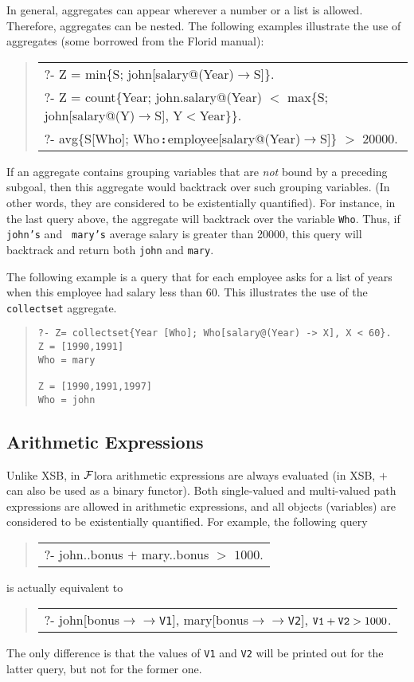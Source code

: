\documentclass[11pt]{article}
\newenvironment{qrules}{\begin{quote}\sf\begin{tabular}[t]{l}}%
{\end{tabular}\end{quote}}
\newcommand{\isa}{\,{\bf{:}}\,}
\newcommand{\fd}{\ensuremath{{\rightarrow}}}                   %
\newcommand{\mvd}{\ensuremath{{\rightarrow\!\!\!\!\rightarrow}}}  %
\newcommand{\FLORA}{{\mbox{${\cal F}${\sc lora}}}\xspace}
\newcommand{\FLORID}{{\mbox{\sc Florid}}\xspace}
\begin{document}
In general, aggregates can appear wherever a number or a list is
allowed. Therefore, aggregates can be nested. The following examples
illustrate the use of aggregates (some borrowed from the \FLORID manual):
\begin{qrules}
  ?- Z = min\{S; john[salary@(Year){\fd}S]\}. \\
  ?- Z = count\{Year; john.salary@(Year) $<$ max\{S; john[salary@(Y){\fd}S],
  Y$<$Year\}\}. \\
  ?- avg\{S[Who]; Who{\isa}employee[salary@(Year){\fd}S]\} $>$ 20000. 
\end{qrules}
If an aggregate contains grouping variables that are \emph{not} bound by a
preceding subgoal, then this aggregate would backtrack over such grouping
variables. (In other words, they are considered to be existentially
quantified). For instance, in the last query above, the aggregate will
backtrack over the variable {\tt Who}. Thus, if {\tt john's} and {\tt
  mary's} average salary is greater than 20000, this query will backtrack
and return both {\tt john} and {\tt mary}.

The following example is a query that for each employee asks for a list of
years when this employee had salary less than 60. This illustrates the use
of the {\tt collectset} aggregate.
\begin{quote}
\begin{verbatim}
?- Z= collectset{Year [Who]; Who[salary@(Year) -> X], X < 60}.
Z = [1990,1991]
Who = mary

Z = [1990,1991,1997]
Who = john
\end{verbatim}
\end{quote}

\subsection{Arithmetic Expressions}

Unlike XSB, in \FLORA arithmetic expressions are always evaluated (in XSB,
$+$ can also be used as a binary functor). Both single-valued and
multi-valued path expressions are allowed in arithmetic expressions, and
all objects (variables) are considered to be existentially quantified. For
example, the following query
\begin{qrules}
?- john..bonus $+$ mary..bonus $>$ $1000$.
\end{qrules}
is actually equivalent to
\begin{qrules}
?- john[bonus{\mvd}{\tt V1}], mary[bonus{\mvd}{\tt V2}], ${\tt V1}+{\tt V2} > 1000$.
\end{qrules}
The only difference is that the values of {\tt V1} and {\tt V2} will be
printed out for the latter query, but not for the former one.
\end{document}
